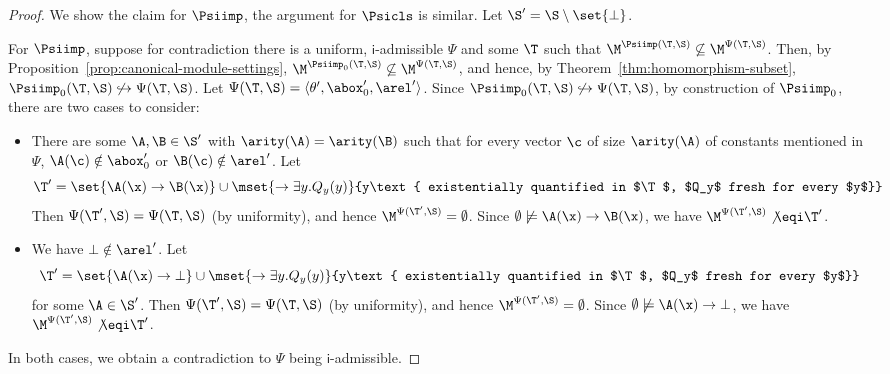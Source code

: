\begin{proof}
  We show the claim for $\Psiimp$, the argument for
  $\Psicls$ is similar. Let $\S'=\S\setminus\set{\bot}$.

  For $\Psiimp$, suppose for contradiction there is a uniform,
  $\mathsf{i}$-admissible $\Psi$ and some $\T$ such that
  $\M^{\Psiimp(\T,\S)}\not\subseteq\M^{\Psi(\T,\S)}$. Then, by
  Proposition~\ref{prop:canonical-module-settings},
  $\M^{\Psiimp_0(\T,\S)}\not\subseteq\M^{\Psi(\T,\S)}$, and hence, by
  Theorem~\ref{thm:homomorphism-subset},
  $\Psiimp_0(\T,\S)\not\hookrightarrow\Psi(\T,\S)$. Let
  $\Psi(\T,\S)=\langle\theta',\abox'_0,\arel'\rangle$. Since
  $\Psiimp_0(\T,\S)\not\hookrightarrow\Psi(\T,\S)$, by construction of
  $\Psiimp_0$, there are two cases to consider:
  \begin{itemize}
  \item There are some $\A,\B\in\S'$ with $\arity(\A)=\arity(\B)$ such
    that for every vector $\c$ of size $\arity(\A)$ of constants
    mentioned in $\Psi$, $\A(\c)\notin\abox'_0$ or
    $\B(\c)\notin\arel'$. Let 
    \[\T'=\set{\A(\x)\to\B(\x)}\cup\mset{\to\exists y.Q_y(y)}{y\text{ existentially
    quantified in $\T$, $Q_y$ fresh for every $y$}}\] 
    Then $\Psi(\T',\S)=\Psi(\T,\S)$ (by uniformity), and
    hence $\M^{\Psi(\T',\S)}=\emptyset$. Since
    $\emptyset\not\models\A(\x)\to\B(\x)$, we have
    $\M^{\Psi(\T',\S)}\not\eqi\T'$.
  \item We have
    $\bot\notin\arel'$. Let
    \[\T'=\set{\A(\x)\to\bot}\cup\mset{\to\exists y.Q_y(y)}{y\text{
        existentially quantified in $\T$, $Q_y$ fresh for every $y$}}\]
    for some $\A\in\S'$. Then $\Psi(\T',\S)=\Psi(\T,\S)$ (by uniformity),
    and hence $\M^{\Psi(\T',\S)}=\emptyset$. Since
    $\emptyset\not\models\A(\x)\to\bot$, we have
    $\M^{\Psi(\T',\S)}\not\eqi\T'$.
  \end{itemize}
  In both cases, we obtain a contradiction to $\Psi$ being
  $\mathsf{i}$-admissible.
%

\end{proof}
